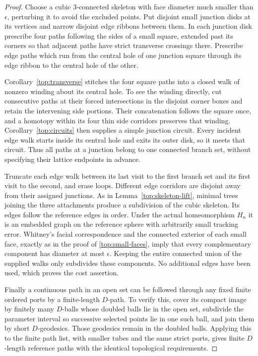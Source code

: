 \begin{proof}
Choose a cubic $3$-connected skeleton with face diameter much
smaller than $\epsilon$, perturbing it to avoid the excluded
points.  Put disjoint small junction disks at its vertices and
narrow disjoint edge ribbons between them.  In each junction
disk prescribe four paths following the sides of a small square,
extended past its corners so that adjacent paths have strict
transverse crossings there.  Prescribe edge paths which run
from the central hole of one junction square through its edge
ribbon to the central hole of the other.

Corollary~\ref{top:transverse} stitches the four square paths
into a closed walk of nonzero winding about its central hole.
To see the winding directly, cut consecutive paths at their
forced intersections in the disjoint corner boxes and retain
the intervening side portions.  Their concatenation follows
the square once, and a homotopy within its four thin side
corridors preserves that winding.  Corollary~\ref{top:circuits}
then supplies a simple junction circuit.  Every incident edge
walk starts inside its central hole and exits its outer disk,
so it meets that circuit.  Thus all paths at a junction belong
to one connected branch set, without specifying their lattice
endpoints in advance.

Truncate each edge walk between its last visit to the first
branch set and its first visit to the second, and erase loops.
Different edge corridors are disjoint away from their assigned
junctions.  As in Lemma~\ref{top:skeleton-lift}, minimal trees
joining the three attachments produce a subdivision of the
cubic skeleton.  Its edges follow the reference edges in
order.  Under the actual homeomorphism $H_n$ it is an embedded
graph on the reference sphere with arbitrarily small tracking
error.  Whitney's facial correspondence and the connected
exterior of each small face, exactly as in the proof of
\eqref{top:small-faces}, imply that every complementary
component has diameter at most $\epsilon$.  Keeping the entire
connected union of the supplied walks only subdivides these
components.  No additional edges have been used, which proves
the cost assertion.

Finally a continuous path in an open set can be followed through
any fixed finite ordered ports by a finite-length $D$-path.
To verify this, cover its compact image by finitely many
$D$-balls whose doubled balls lie in the open set, subdivide
the parameter interval so successive selected points lie in
one such ball, and join them by short $D$-geodesics.  Those
geodesics remain in the doubled balls.  Applying this to the
finite path list, with smaller tubes and the same strict
ports, gives finite $D$-length reference paths with the
identical topological requirements.
\end{proof}
